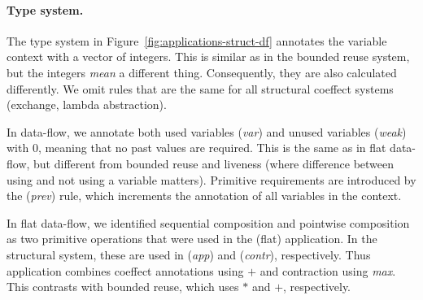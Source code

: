 \paragraph{Type system.} 
The type system in Figure~\ref{fig:applications-struct-df} annotates the variable context with a
vector of integers. This is similar as in the bounded reuse system, but the integers \emph{mean} a
different thing. Consequently, they are also calculated differently. We omit rules that are the
same for all structural coeffect systems (exchange, lambda abstraction).

In data-flow, we annotate both used variables (\emph{var}) and unused variables (\emph{weak}) with
$0$, meaning that no past values are required. This is the same as in flat data-flow, but different
from bounded reuse and liveness (where difference between using and not using a variable matters).
Primitive requirements are introduced by the (\emph{prev}) rule, which increments the annotation of
all variables in the context.

In flat data-flow, we identified sequential composition and pointwise composition as two primitive
operations that were used in the (flat) application. In the structural system, these are used in 
(\emph{app}) and (\emph{contr}), respectively. Thus application combines coeffect annotations using
$+$ and contraction using \emph{max}. This contrasts with bounded reuse, which uses $\ast$ and $+$,
respectively.

